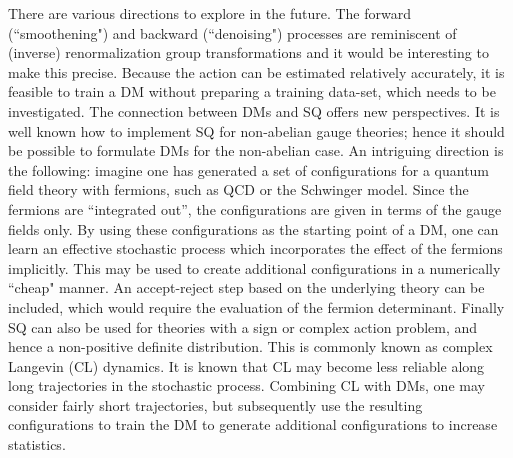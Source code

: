 There are various directions to explore in the future. The forward (``smoothening") and backward (``denoising") processes are reminiscent of (inverse) renormalization group transformations and it would be interesting to make this precise.   
Because the action can be estimated relatively accurately, it is feasible to train a DM without preparing a training data-set, which needs to be investigated.
The connection between DMs and SQ offers new perspectives. It is well known how to implement SQ for non-abelian gauge theories; hence it should be possible to formulate DMs for the non-abelian case. An intriguing direction is the following: imagine one has generated a set of configurations for a quantum field theory with fermions, such as QCD or the Schwinger model. Since the fermions are ``integrated out'', the configurations are given in terms of the gauge fields only. By using these configurations as the starting point of a DM, one can learn an effective stochastic process which incorporates the effect of the fermions implicitly. This may be used to create additional configurations in a numerically ``cheap" manner. An accept-reject step based on the underlying theory can be included, which would require the evaluation of the fermion determinant. Finally SQ can also be used for theories with a sign or complex action problem, and hence a non-positive definite distribution. This is commonly known as complex Langevin (CL) dynamics. It is known that CL may become less reliable along long trajectories in the stochastic process. Combining CL with DMs, one may consider fairly short trajectories, but subsequently use the resulting configurations to train the DM to generate additional configurations to increase statistics. 

